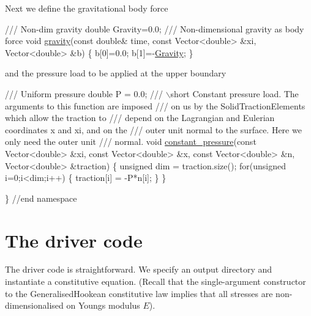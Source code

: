 Next we define the gravitational body force


\begin{DoxyCodeInclude}
\textcolor{comment}{}
\textcolor{comment}{ /// Non-dim gravity}
\textcolor{comment}{} \textcolor{keywordtype}{double} Gravity=0.0;
\textcolor{comment}{}
\textcolor{comment}{ /// Non-dimensional gravity as body force}
\textcolor{comment}{} \textcolor{keywordtype}{void} \hyperlink{namespaceGlobal__Physical__Variables_a0777aef63372db7f91ad894c38159681}{gravity}(\textcolor{keyword}{const} \textcolor{keywordtype}{double}& time, 
              \textcolor{keyword}{const} Vector<double> &xi, 
              Vector<double> &b)
 \{
  b[0]=0.0;
  b[1]=-\hyperlink{namespaceGlobal__Physical__Variables_a8b80d3e8d63b8d0a0ed435a2dd7fe2ad}{Gravity};
 \}

\end{DoxyCodeInclude}


and the pressure load to be applied at the upper boundary


\begin{DoxyCodeInclude}
 \textcolor{comment}{}
\textcolor{comment}{ /// Uniform pressure}
\textcolor{comment}{} \textcolor{keywordtype}{double} P = 0.0;
\textcolor{comment}{}
\textcolor{comment}{ /// \(\backslash\)short Constant pressure load. The arguments to this function are imposed}
\textcolor{comment}{ /// on us by the SolidTractionElements which allow the traction to }
\textcolor{comment}{ /// depend on the Lagrangian and Eulerian coordinates x and xi, and on the }
\textcolor{comment}{ /// outer unit normal to the surface. Here we only need the outer unit}
\textcolor{comment}{ /// normal.}
\textcolor{comment}{} \textcolor{keywordtype}{void} \hyperlink{namespaceGlobal__Physical__Variables_a19f4e20a92e7d216b4d2b00308f96917}{constant\_pressure}(\textcolor{keyword}{const} Vector<double> &xi, \textcolor{keyword}{const} Vector<double> &x,
                        \textcolor{keyword}{const} Vector<double> &n, Vector<double> &traction)
 \{
  \textcolor{keywordtype}{unsigned} dim = traction.size();
  \textcolor{keywordflow}{for}(\textcolor{keywordtype}{unsigned} i=0;i<dim;i++)
   \{
    traction[i] = -P*n[i];
   \}
 \} 

\} \textcolor{comment}{//end namespace}

\end{DoxyCodeInclude}




 

\hypertarget{index_main}{}\section{The driver code}\label{index_main}
The driver code is straightforward. We specify an output directory and instantiate a constitutive equation. (Recall that the single-\/argument constructor to the {\ttfamily Generalised\+Hookean} constitutive law implies that all stresses are non-\/dimensionalised on Young\textquotesingle{}s modulus $ E $).

